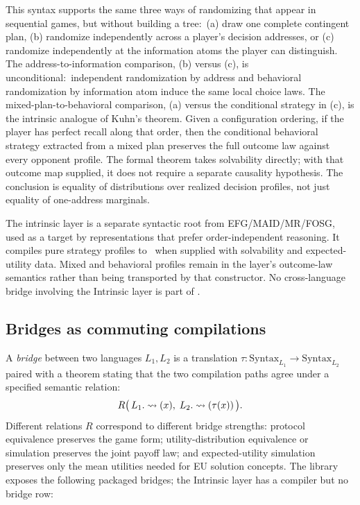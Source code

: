 This syntax supports the same three ways of randomizing that
appear in sequential games, but without building a tree:\ (a) draw
one complete contingent plan, (b) randomize independently across a
player's decision addresses, or (c) randomize independently at the
information atoms the player can distinguish.  The address-to-information
comparison, (b) versus (c), is unconditional:\ independent
randomization by address and behavioral randomization by information
atom induce the same local choice laws.  The mixed-plan-to-behavioral
comparison, (a) versus the conditional strategy in (c), is the
intrinsic analogue of Kuhn's theorem.  Given a configuration ordering,
if the player has perfect recall along that order, then the conditional
behavioral strategy extracted from a mixed plan preserves the full
outcome law against every opponent profile.  The formal theorem takes
solvability directly; with that outcome map supplied, it does not require
a separate causality hypothesis.
The conclusion is equality of distributions over realized
decision profiles, not just equality of one-address marginals.

The intrinsic layer is a separate syntactic root from
EFG/MAID/MR/FOSG, used as a target by representations that prefer
order-independent reasoning.  It compiles pure strategy profiles to \KG\
when supplied with solvability and expected-utility data.  Mixed and
behavioral profiles remain in the layer's outcome-law semantics rather
than being transported by that constructor.  No cross-language bridge
involving the Intrinsic layer is part of
.


\subsection{Bridges as commuting compilations}
\label{sec:languages:bridges}

A \emph{bridge} between two languages $L_1, L_2$ is a translation
$\tau : \mathrm{Syntax}_{L_1} \to \mathrm{Syntax}_{L_2}$ paired with
a theorem stating that the two compilation paths agree under a
specified semantic relation:
\begin{equation}
\label{eq:bridge}
  R\bigl(\,L_1.\rightsquigarrow(x),\;L_2.\rightsquigarrow(\tau(x))\,\bigr).
\end{equation}
Different relations $R$ correspond to different bridge strengths:
protocol equivalence preserves the game form; utility-distribution
equivalence or simulation preserves the joint payoff law; and
expected-utility simulation preserves only the mean utilities needed
for EU solution concepts.  The library exposes the following packaged
bridges; the Intrinsic layer has a compiler but no bridge row:

